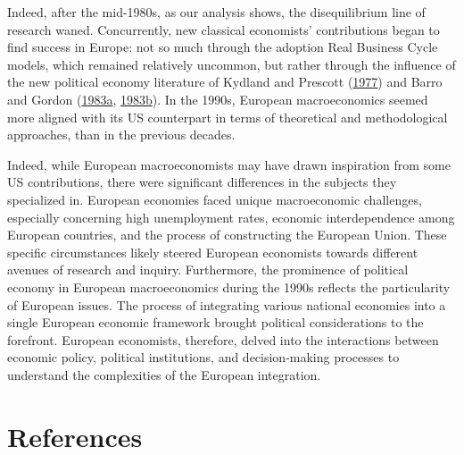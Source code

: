 \documentclass[
  12pt,
  onecolumn]{article}
\begin{document}
Indeed, after the mid-1980s, as our analysis shows, the disequilibrium line of research waned. Concurrently, new classical economists' contributions began to find success in Europe: not so much through the adoption Real Business Cycle models, which remained relatively uncommon, but rather through the influence of the new political economy literature of Kydland and Prescott (\protect\hyperlink{ref-kydland1977}{1977}) and Barro and Gordon (\protect\hyperlink{ref-barro1983}{1983a}, \protect\hyperlink{ref-barro1983c}{1983b}). In the 1990s, European macroeconomics seemed more aligned with its US counterpart in terms of theoretical and methodological approaches, than in the previous decades.

Indeed, while European macroeconomists may have drawn inspiration from some US contributions, there were significant differences in the subjects they specialized in. European economies faced unique macroeconomic challenges, especially concerning high unemployment rates, economic interdependence among European countries, and the process of constructing the European Union. These specific circumstances likely steered European economists towards different avenues of research and inquiry. Furthermore, the prominence of political economy in European macroeconomics during the 1990s reflects the particularity of European issues. The process of integrating various national economies into a single European economic framework brought political considerations to the forefront. European economists, therefore, delved into the interactions between economic policy, political institutions, and decision-making processes to understand the complexities of the European integration.

\newpage

\hypertarget{references}{%
\section*{References}\label{references}}
\end{document}
